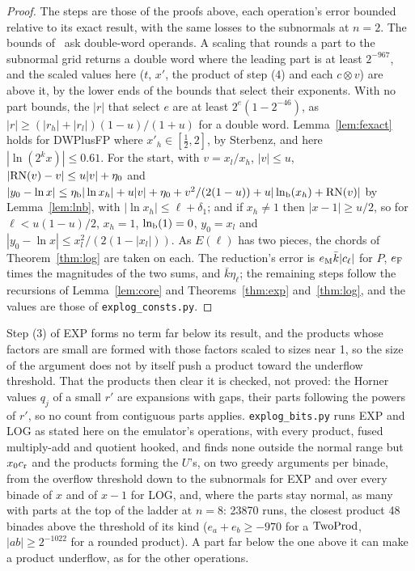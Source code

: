 \begin{proof}
The steps are those of the proofs above, each operation's error bounded relative to its exact result, with the same
losses to the subnormals at $n = 2$. The bounds of~\cite{JMP17,MR22} ask double-word operands. A scaling that rounds
a part to the subnormal grid returns a double word where the leading part is at least $2^{-967}$, and the scaled values
here ($t$, $x'$, the product of step (4) and each $c \otimes v$) are above it, by the lower ends of the bounds that
select their exponents. With no part bounds, the $|r|$ that select $e$ are at least $2^e(1 - 2^{-46})$, as $|r| \ge
(|r_h| + |r_l|)(1-u)/(1+u)$ for a double word. Lemma~\ref{lem:fexact} holds for DWPlusFP where $x'_h \in [\frac12, 2]$, by Sterbenz, and
here $|\ln(2^kx)| \le 0.61$. For the start, with $v = x_l/x_h$, $|v| \le u$, $|\mathrm{RN}(v) - v| \le u|v| + \eta_0$
and $|y_0 - \ln x| \le \eta_{\rm b}|\ln x_h| + u|v| + \eta_0 + v^2/(2(1-u)) + u|\ln_{\rm b}(x_h) + \mathrm{RN}(v)|$ by
Lemma~\ref{lem:lnb}, with $|\ln x_h| \le \ell + \delta_1$; and if $x_h \ne 1$ then $|x - 1| \ge u/2$, so for $\ell <
u(1-u)/2$, $x_h = 1$, $\ln_{\rm b}(1) = 0$, $y_0 = x_l$ and $|y_0 - \ln x| \le x_l^2/(2(1 - |x_l|))$. As $E(\ell)$ has
two pieces, the chords of Theorem~\ref{thm:log} are taken on each. The reduction's
error is $e_{\rm M}\bar k|c_\ell|$ for $P$, $e_{\rm F}$ times the magnitudes of the two sums, and $\bar k\eta_\ell$; the
remaining steps follow the recursions of Lemma~\ref{lem:core} and Theorems~\ref{thm:exp} and~\ref{thm:log}, and the
values are those of \texttt{explog\_consts.py}.
\end{proof}

 Step (3) of EXP forms no term far below its result, and the products whose factors
are small are formed with those factors scaled to sizes near 1, so the size of the argument does not by itself push a
product toward the underflow threshold. That the products then clear it is checked, not proved: the Horner values $q_j$
of a small $r'$ are expansions with gaps, their parts following the powers of $r'$, so no count from contiguous parts
applies. \texttt{explog\_bits.py} runs EXP and LOG as stated here on the emulator's operations, with every product,
fused multiply-add and quotient hooked, and finds none outside the normal range but $x_0c_{\rm r}$ and the products
forming the $U$'s, on two greedy arguments per binade, from the overflow threshold down to the subnormals for EXP and
over every binade of $x$ and of $x - 1$ for LOG, and, where the parts stay normal, as many with parts at the top of the
ladder at $n = 8$: 23870 runs, the closest product 48 binades above the threshold of its kind ($e_a + e_b \ge -970$ for
a $\mathrm{TwoProd}$, $|ab| \ge 2^{-1022}$ for a rounded product). A part far below the one above it can make a product
underflow, as for the other operations.

